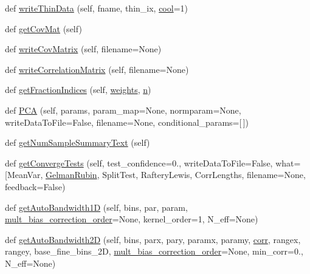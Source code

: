 \begin{DoxyCompactItemize}
\item 
def \mbox{\hyperlink{classgetdist_1_1mcsamples_1_1MCSamples_a54d3885a66251e46d1d478342dec866e}{write\+Thin\+Data}} (self, fname, thin\+\_\+ix, \mbox{\hyperlink{classgetdist_1_1chains_1_1WeightedSamples_ac1117664a18dbf44a352512c36c6a675}{cool}}=1)
\item 
def \mbox{\hyperlink{classgetdist_1_1mcsamples_1_1MCSamples_a2b52bd7f0fb69759e1170cec6b336c75}{get\+Cov\+Mat}} (self)
\item 
def \mbox{\hyperlink{classgetdist_1_1mcsamples_1_1MCSamples_ac0630cea17b369b81474a446073d8604}{write\+Cov\+Matrix}} (self, filename=None)
\item 
def \mbox{\hyperlink{classgetdist_1_1mcsamples_1_1MCSamples_a29a520ddd47facaf90753bb81f638696}{write\+Correlation\+Matrix}} (self, filename=None)
\item 
def \mbox{\hyperlink{classgetdist_1_1mcsamples_1_1MCSamples_a74ef903cb27895eefe585592947b1c1a}{get\+Fraction\+Indices}} (self, \mbox{\hyperlink{classgetdist_1_1chains_1_1Chains_a3a9751f705a3a6d28439a4011060f6f8}{weights}}, \mbox{\hyperlink{classgetdist_1_1chains_1_1WeightedSamples_a4343f22364965b552f30d4c63396ffdb}{n}})
\item 
def \mbox{\hyperlink{classgetdist_1_1mcsamples_1_1MCSamples_aa70441a6c22c1b03f47f56f08fd67cd1}{P\+CA}} (self, params, param\+\_\+map=None, normparam=None, write\+Data\+To\+File=False, filename=None, conditional\+\_\+params=\mbox{[}$\,$\mbox{]})
\item 
def \mbox{\hyperlink{classgetdist_1_1mcsamples_1_1MCSamples_a49be5a63d735fd9f9436b8f135371a6a}{get\+Num\+Sample\+Summary\+Text}} (self)
\item 
def \mbox{\hyperlink{classgetdist_1_1mcsamples_1_1MCSamples_afafaf8166588387f41b032b9b8b61c0d}{get\+Converge\+Tests}} (self, test\+\_\+confidence=0., write\+Data\+To\+File=False, what=\mbox{[}\textquotesingle{}Mean\+Var\textquotesingle{}, \mbox{\hyperlink{classgetdist_1_1mcsamples_1_1MCSamples_ae63a6a660827467c3ac69bae90feaa63}{Gelman\+Rubin}}, Split\+Test, Raftery\+Lewis, Corr\+Lengths, filename=None, feedback=False)
\item 
def \mbox{\hyperlink{classgetdist_1_1mcsamples_1_1MCSamples_a0e632352cb52bb4c05cb060427fcb0bc}{get\+Auto\+Bandwidth1D}} (self, bins, par, param, \mbox{\hyperlink{classgetdist_1_1mcsamples_1_1MCSamples_a261812fac6f2f58941d4259ce8177793}{mult\+\_\+bias\+\_\+correction\+\_\+order}}=None, kernel\+\_\+order=1, N\+\_\+eff=None)
\item 
def \mbox{\hyperlink{classgetdist_1_1mcsamples_1_1MCSamples_a3445486ce2813000c1306234fb2dd6f3}{get\+Auto\+Bandwidth2D}} (self, bins, parx, pary, paramx, paramy, \mbox{\hyperlink{classgetdist_1_1chains_1_1WeightedSamples_ad7fc11d463b6ebe773ecd156e7e7bcce}{corr}}, rangex, rangey, base\+\_\+fine\+\_\+bins\+\_\+2D, \mbox{\hyperlink{classgetdist_1_1mcsamples_1_1MCSamples_a261812fac6f2f58941d4259ce8177793}{mult\+\_\+bias\+\_\+correction\+\_\+order}}=None, min\+\_\+corr=0., N\+\_\+eff=None)

\end{DoxyCompactItemize}
